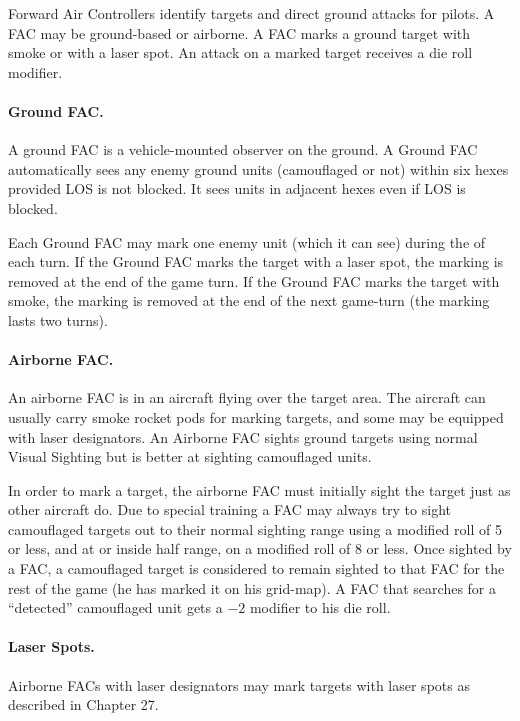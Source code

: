 \begin{advancedrules}
\iffalse
Forward Air Controllers identify targets and direct ground attacks for pilots. A FAC may be ground-based or airborne. A FAC marks a ground target with smoke or with a laser spot. An attack on a marked target receives a  die roll modifier.

\paragraph{Ground FAC.} A ground FAC is a vehicle-mounted observer on the ground. A Ground FAC automatically sees any enemy ground units (camouflaged or not) within six hexes provided LOS is not blocked. It sees units in adjacent hexes even if LOS is blocked.

Each Ground FAC may mark one enemy unit (which it can see) during the  of each turn. If the Ground FAC marks the target with a laser spot, the marking is removed at the end of the game turn. If the Ground FAC marks the target with smoke, the marking is removed at the end of the next game-turn (the marking lasts two turns).

\paragraph{Airborne FAC.} An airborne FAC is in an aircraft flying over the target area. The aircraft can usually carry smoke rocket pods for marking targets, and some may be equipped with laser designators. An Airborne FAC sights ground targets using normal Visual Sighting but is better at sighting camouflaged units.

In order to mark a target, the airborne FAC must initially sight the target just as other aircraft do. Due to special training a FAC may always try to sight camouflaged targets out to their normal sighting range using a modified roll of 5 or less, and at or inside half range, on a modified roll of 8 or less. Once sighted by a FAC, a camouflaged target is considered to remain sighted to that FAC for the rest of the game (he has marked it on his grid-map). A FAC that searches for a “detected” camouflaged unit gets a $-2$ modifier to his die roll.

\paragraph{Laser Spots.} Airborne FACs with laser designators may mark targets with laser spots as described in Chapter 27.


\end{advancedrules}
